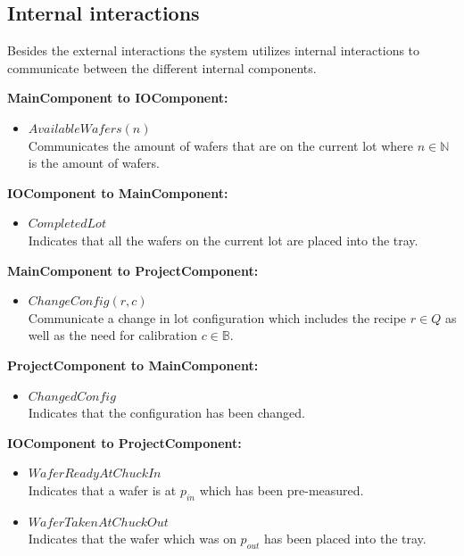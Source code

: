 \subsection{Internal interactions}
Besides the external interactions the system utilizes internal interactions to communicate between the different internal components.

\textbf{MainComponent to IOComponent:}
\begin{itemize}
    \item $\mathit{AvailableWafers}(n)$\\
    Communicates the amount of wafers that are on the current lot where $n \in \mathbb{N}$ is the amount of wafers.
\end{itemize}

\textbf{IOComponent to MainComponent:}
\begin{itemize}
    \item $\mathit{CompletedLot}$\\
    Indicates that all the wafers on the current lot are placed into the tray.
\end{itemize}

\textbf{MainComponent to ProjectComponent:}
\begin{itemize}
    \item $\mathit{ChangeConfig}(r, c)$\\
    Communicate a change in lot configuration which includes the recipe $r \in Q$ as well as the need for calibration $c \in \mathbb{B}$.
\end{itemize}

\textbf{ProjectComponent to MainComponent:}
\begin{itemize}
    \item $\mathit{ChangedConfig}$\\
    Indicates that the configuration has been changed.
\end{itemize}

\textbf{IOComponent to ProjectComponent:}
\begin{itemize}
    \item $\mathit{WaferReadyAtChuckIn}$\\
    Indicates that a wafer is at $p_\mathit{in}$ which has been pre-measured.
    \item $\mathit{WaferTakenAtChuckOut}$\\
    Indicates that the wafer which was on $p_\mathit{out}$ has been placed into the tray.
\end{itemize}

